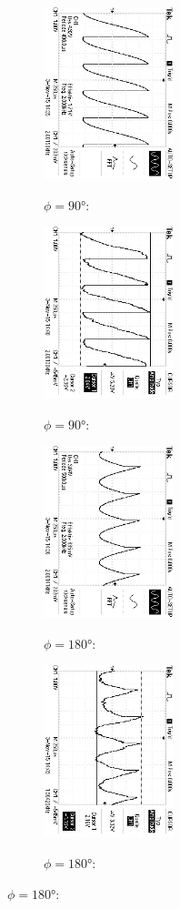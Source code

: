 \begin{figure}
\begin{subfigure}{0.48\textwidth}
\centering
\caption{$\phi=90°$:}
\includegraphics[angle=90,height=5cm]{graphics/ALL0033/F0033TEK.jpg}
\label{fig:phi90o}
\end{subfigure}
\begin{subfigure}{0.48\textwidth}
\centering
\caption{$\phi=90°$:}
\includegraphics[angle=90,height=5cm]{graphics/ALL0041/F0041TEK.jpg}
\label{fig:phi90m}
\end{subfigure}

\begin{subfigure}{0.48\textwidth}
\centering
\caption{$\phi=180°$:}
\includegraphics[angle=90,height=5cm]{graphics/ALL0034/F0034TEK.jpg}
\label{fig:phi180o}
\end{subfigure}
\begin{subfigure}{0.48\textwidth}
\centering
\caption{$\phi=180°$:}
\includegraphics[angle=90,height=5cm]{graphics/ALL0042/F0042TEK.jpg}
\label{fig:phi180m}
\end{subfigure}


\end{figure}
